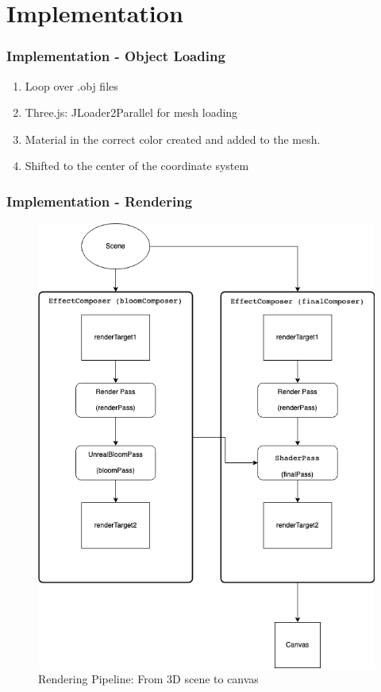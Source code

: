 \documentclass{beamer}
\begin{document}
\section{Implementation} 

\begin{frame}
\frametitle{Implementation - Object Loading}
\begin{enumerate}
\item Loop over .obj files
\item Three.js: JLoader2Parallel for mesh loading
\item Material in the correct color created and added to the mesh. 
\item Shifted to the center of the coordinate system
\end{enumerate}
\end{frame}


\begin{frame}
\frametitle{Implementation - Rendering}
\begin{figure}[h]
  \centering
  \includegraphics[width=0.5\linewidth]{../../screenshots/images/render.png}
  \caption{\label{fig:renderingPipelien} Rendering Pipeline: From 3D scene to canvas}
\end{figure}

\end{frame}
\end{document}
